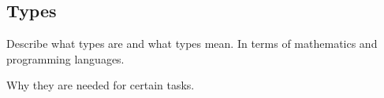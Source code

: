 \subsection{Types}

Describe what types are and what types mean.
In terms of mathematics and programming languages.

Why they are needed for certain tasks.
